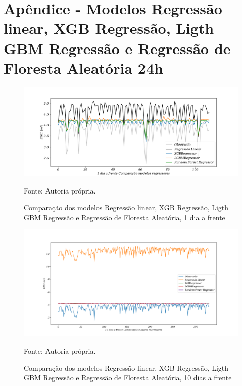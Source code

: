 
\section{Ap\^endice - Modelos Regress\~ao linear, XGB Regress\~ao, Ligth GBM Regress\~ao e Regress\~ao de Floresta Aleat\'oria 24h}\label{sec:lrxgblgbmrf24}

\begin{figure}[H]
	\centering
	\caption{Comparação dos modelos Regressão linear, XGB Regressão, Ligth GBM Regressão e Regressão de Floresta Aleatória, 1 dia a frente }
	\label{fig:1-LR-XGB-LGBM-RF24}
	\includegraphics[width=1\linewidth]{Apendices/Figuras/modelagem-24h/1-LR-XGB-LGBM-RF}
	
	Fonte: Autoria própria.
\end{figure}

\begin{figure}[H]
	\centering
	\caption{Comparação dos modelos Regressão linear, XGB Regressão, Ligth GBM Regressão e Regressão de Floresta Aleatória, 10 dias a frente }
	\label{fig:10-LR-XGB-LGBM-RF24}
	\includegraphics[width=1\linewidth]{Apendices/Figuras/modelagem-24h/10-LR-XGB-LGBM-RF}
	
	Fonte: Autoria própria.
\end{figure}


